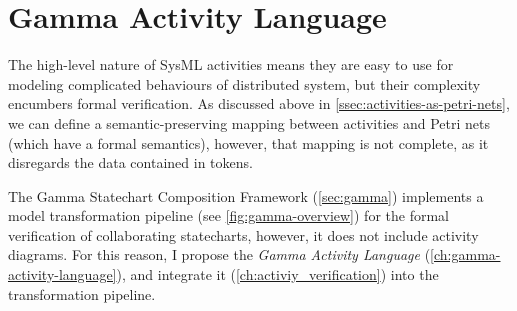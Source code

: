 \chapter{Gamma Activity Language}\label{ch:gamma-activity-language}

The high-level nature of SysML activities means they are easy to use for modeling complicated behaviours of distributed system, but their complexity encumbers formal verification. As discussed above in \autoref{ssec:activities-as-petri-nets}, we can define a semantic-preserving mapping between activities and Petri nets (which have a formal semantics), however, that mapping is not complete, as it disregards the data contained in tokens.

The Gamma Statechart Composition Framework (\autoref{sec:gamma}) implements a model transformation pipeline (see \autoref{fig:gamma-overview}) for the formal verification of collaborating statecharts, however, it does not include activity diagrams. For this reason, I propose the \emph{Gamma Activity Language} (\autoref{ch:gamma-activity-language}), and integrate it (\autoref{ch:activiy_verification}) into the transformation pipeline.




